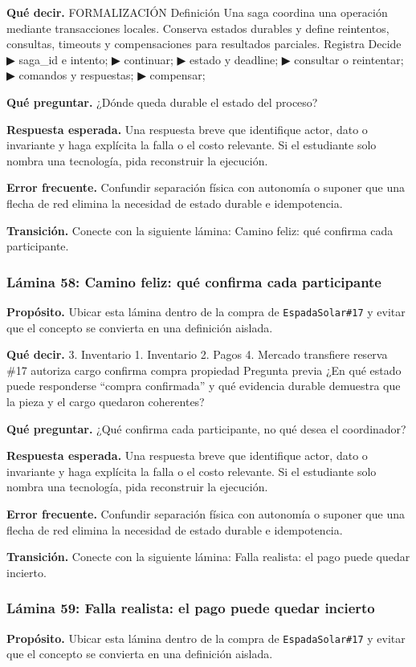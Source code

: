 \documentclass[variant=docente,cover=institutional,mode=screen]{ua-engineering-v6-article}
\begin{document}
\textbf{Qué decir.} FORMALIZACIÓN Definición Una saga coordina una operación mediante transacciones locales. Conserva estados durables y define reintentos, consultas, timeouts y compensaciones para resultados parciales. Registra Decide ▶ saga\_id e intento; ▶ continuar; ▶ estado y deadline; ▶ consultar o reintentar; ▶ comandos y respuestas; ▶ compensar;

\textbf{Qué preguntar.} ¿Dónde queda durable el estado del proceso?

\textbf{Respuesta esperada.} Una respuesta breve que identifique actor, dato o invariante y haga explícita la falla o el costo relevante. Si el estudiante solo nombra una tecnología, pida reconstruir la ejecución.

\textbf{Error frecuente.} Confundir separación física con autonomía o suponer que una flecha de red elimina la necesidad de estado durable e idempotencia.

\textbf{Transición.} Conecte con la siguiente lámina: Camino feliz: qué confirma cada participante.

\subsubsection*{Lámina 58: Camino feliz: qué confirma cada participante}
\textbf{Propósito.} Ubicar esta lámina dentro de la compra de \texttt{EspadaSolar\#17} y evitar que el concepto se convierta en una definición aislada.

\textbf{Qué decir.} 3. Inventario 1. Inventario 2. Pagos 4. Mercado transfiere reserva \#17 autoriza cargo confirma compra propiedad Pregunta previa ¿En qué estado puede responderse “compra confirmada” y qué evidencia durable demuestra que la pieza y el cargo quedaron coherentes?

\textbf{Qué preguntar.} ¿Qué confirma cada participante, no qué desea el coordinador?

\textbf{Respuesta esperada.} Una respuesta breve que identifique actor, dato o invariante y haga explícita la falla o el costo relevante. Si el estudiante solo nombra una tecnología, pida reconstruir la ejecución.

\textbf{Error frecuente.} Confundir separación física con autonomía o suponer que una flecha de red elimina la necesidad de estado durable e idempotencia.

\textbf{Transición.} Conecte con la siguiente lámina: Falla realista: el pago puede quedar incierto.

\subsubsection*{Lámina 59: Falla realista: el pago puede quedar incierto}
\textbf{Propósito.} Ubicar esta lámina dentro de la compra de \texttt{EspadaSolar\#17} y evitar que el concepto se convierta en una definición aislada.
\end{document}
